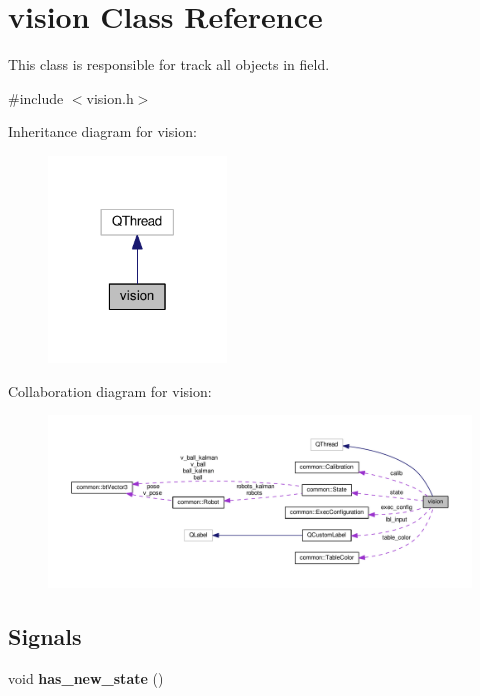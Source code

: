 \hypertarget{classvision}{}\section{vision Class Reference}
\label{classvision}


This class is responsible for track all objects in field.  




{\ttfamily \#include $<$vision.\+h$>$}



Inheritance diagram for vision\+:
\nopagebreak
\begin{figure}[H]
\begin{center}
\leavevmode
\includegraphics[width=134pt]{classvision__inherit__graph}
\end{center}
\end{figure}


Collaboration diagram for vision\+:
\nopagebreak
\begin{figure}[H]
\begin{center}
\leavevmode
\includegraphics[width=350pt]{classvision__coll__graph}
\end{center}
\end{figure}
\subsection*{Signals}
\begin{DoxyCompactItemize}
\item 
void {\bfseries has\+\_\+new\+\_\+state} ()\hypertarget{classvision_aa218dcf92d5b787ce59f5fd66ced8967}{}\label{classvision_aa218dcf92d5b787ce59f5fd66ced8967}

\end{DoxyCompactItemize}
